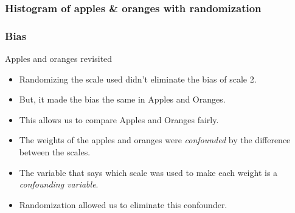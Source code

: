\documentclass[handout]{beamer}
\begin{document}
   \begin{frame}
   \frametitle{Histogram of apples \& oranges with randomization}
   \begin{center}
   \end{center}

   \end{frame}


   \begin{frame} \frametitle{Bias}

   \begin{block}
   {Apples and oranges revisited}
   \begin{itemize}
   \item Randomizing the scale used didn't eliminate the bias
   of scale 2.
   \item But, it made the bias the same in Apples and Oranges.
   \item This allows us to compare Apples and Oranges fairly.
   \item The weights of the apples and oranges were {\em confounded} by the difference between the scales.
   \item The variable that says which scale was used to make each weight
   is a {\em confounding variable}.
   \item Randomization allowed us to eliminate this confounder.
   \end{itemize}
   \end{block}
   \end{frame}

\end{document}
